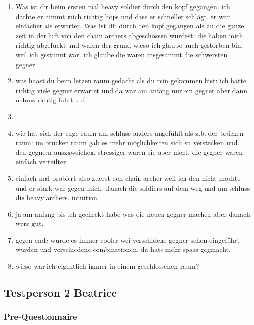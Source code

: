 \documentclass[../Main.tex]{subfiles}
\begin{document}
\begin{enumerate}[label=\textbf{I\arabic*}, leftmargin=1.5cm, itemsep=1em]
    \item Was ist dir beim ersten mal heavy soldier durch den kopf gegangen: ich dachte er nimmt mich richtig hops und dass er schneller schlägt. er war einfacher als erwartet. Was ist dir durch den kopf gegangen als du die ganze zeit in der luft von den chain archers abgeschossen wurdest: die haben mich richtig abgefuckt und waren der grund wieso ich glaube auch gestorben bin, weil ich gestunnt war. ich glaube die waren insgesammt die schwersten gegner.
    \item was haast du beim letzen raum gedacht als du rein gekommen bist: ich hatte richtig viele gegner erwartet und da war am anfang nur ein gegner aber dann nahms richtig fahrt auf.

    \item
    \item wie hat sich der enge raum am schluss anders angefühlt als z.b. der brücken raum: im brücken raum gab es mehr möglichkeiten sich zu verstecken und den gegnern auszuweichen. stressiger waren sie aber nicht. die gegner waren einfach verteilter.

    \item einfach mal probiert also zuerst den chain archer weil ich den nicht mochte und er stark war gegen mich. danach die soldiers auf dem weg und am schluss die heavy archers. intuition
    \item ja am anfang bis ich gecheckt habe was die neuen gegner machen aber danach wars gut.

    \item gegen ende wurde es immer cooler wei verschidene gegner schon eingeführt wurden und verschiedene combinationen, da hats mehr spass gegmacht.

    \item wieso war ich eigentlich immer in einem geschlossenen raum?
\end{enumerate}

\subsection{Testperson 2 Beatrice}

\subsubsection{Pre-Questionnaire}
\end{document}
